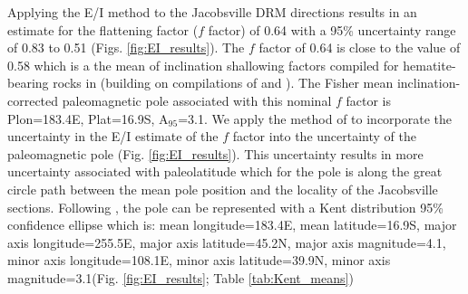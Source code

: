 \documentclass[draft]{agujournal2019}
\begin{document}
Applying the E/I method to the Jacobsville DRM directions results in an estimate for the flattening factor ($f$ factor) of 0.64 with a 95\% uncertainty range of 0.83 to 0.51 (Figs. \ref{fig:EI_results}). The $f$ factor of 0.64 is close to the value of 0.58 which is a the mean of inclination shallowing factors compiled for hematite-bearing rocks in  (building on compilations of  and ). The Fisher mean inclination-corrected paleomagnetic pole associated with this nominal $f$ factor is Plon=183.4\textdegree E, Plat=16.9\textdegree S, A$_{95}$=3.1\textdegree. We apply the method of  to incorporate the uncertainty in the E/I estimate of the $f$ factor into the uncertainty of the paleomagnetic pole (Fig. \ref{fig:EI_results}). This uncertainty results in more uncertainty associated with paleolatitude which for the pole is along the great circle path between the mean pole position and the locality of the Jacobsville sections. Following , the pole can be represented with a Kent distribution 95\% confidence ellipse which is: mean longitude=183.4\textdegree E, mean latitude=16.9\textdegree S, major axis longitude=255.5\textdegree E, major axis latitude=45.2\textdegree N, major axis magnitude=4.1\textdegree, minor axis longitude=108.1\textdegree E, minor axis latitude=39.9\textdegree N, minor axis magnitude=3.1\textdegree (Fig. \ref{fig:EI_results}; Table \ref{tab:Kent_means})

\end{document}
